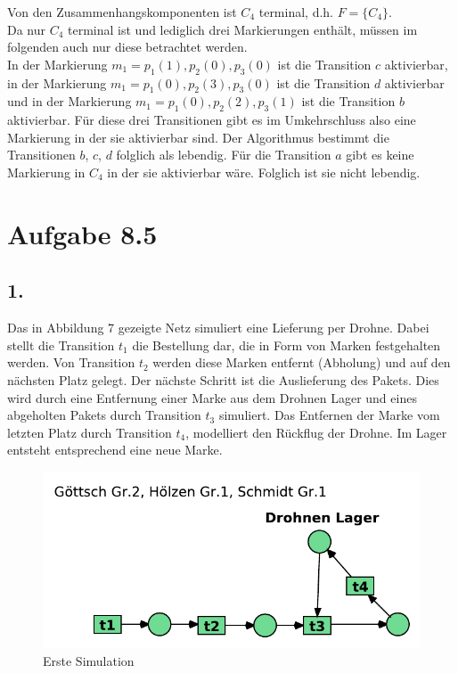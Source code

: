 \documentclass[12pt, paper=a4]{article}
\begin{document}
Von den Zusammenhangskomponenten ist \(C_4\) terminal, d.h. \(F=\{C_4\}\).\\
Da nur $C_{4}$ terminal ist und lediglich drei Markierungen enthält, müssen im folgenden auch nur diese betrachtet werden.\\
In der Markierung $m_{1}=p_{1}(1),p_{2}(0),p_{3}(0)$ ist die Transition $c$ aktivierbar,
in der Markierung $m_{1}=p_{1}(0),p_{2}(3),p_{3}(0)$ ist die Transition $d$ aktivierbar und in der Markierung $m_{1}=p_{1}(0),p_{2}(2),p_{3}(1)$ ist die Transition $b$ aktivierbar. Für diese drei Transitionen gibt es im Umkehrschluss also eine Markierung in der sie aktivierbar sind. Der Algorithmus bestimmt die Transitionen $b$, $c$, $d$ folglich als lebendig. Für die Transition $a$ gibt es keine Markierung in $C_{4}$ in der sie aktivierbar wäre. Folglich ist sie nicht lebendig.


\section*{Aufgabe 8.5}
\subsection*{1.}
Das in Abbildung 7 gezeigte Netz simuliert eine Lieferung per Drohne. Dabei stellt die Transition $t_1$ die Bestellung dar, die in Form von Marken festgehalten werden. Von Transition $t_2$ werden diese Marken entfernt (Abholung) und auf den nächsten Platz gelegt. Der nächste Schritt ist die Auslieferung des Pakets. Dies wird durch eine Entfernung einer Marke aus dem Drohnen Lager und eines abgeholten Pakets durch Transition $t_3$ simuliert. Das Entfernen der Marke vom letzten Platz durch Transition $t_4$, modelliert den Rückflug der Drohne. Im Lager entsteht entsprechend eine neue Marke.\\

\begin{figure}[h!]
	\centering
	\includegraphics[scale=0.8]{8-5-1.pdf}
	\caption{Erste Simulation}
\end{figure}
\end{document}
